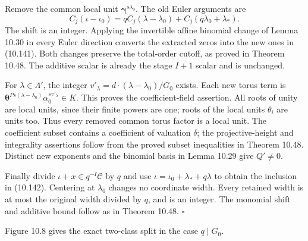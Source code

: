 \documentclass[
  11pt,
  a4paper,
]{article}
\begin{document}
Remove the common local unit \(\boldsymbol\gamma^{s\lambda_0}\). The old
Euler arguments are \[
C_j(\iota-\iota_0)=
qC_j(\lambda-\lambda_0)+C_j(q\lambda_0+\lambda_*).
\] The shift is an integer. Applying the invertible affine binomial
change of Lemma 10.30 in every Euler direction converts the extracted
zeros into the new ones in (10.141). Both changes preserve the
total-order cutoff, as proved in Theorem 10.48. The additive scalar is
already the stage \(I+1\) scalar and is unchanged.

For \(\lambda\in\Lambda'\), the integer
\(v'_\lambda=d\cdot(\lambda-\lambda_0)/G_0\) exists. Each new torus term
is
\(\boldsymbol\theta^{Ps(\lambda-\lambda_0)}\alpha_0^{s v'_\lambda}\in K\).
This proves the coefficient-field assertion. All roots of unity are
local units, since their finite powers are one; roots of the local units
\(\theta_i\) are units too. Thus every removed common torus factor is a
local unit. The coefficient subset contains a coefficient of valuation
\(\delta\); the projective-height and integrality assertions follow from
the proved subset inequalities in Theorem 10.48. Distinct new exponents
and the binomial basis in Lemma 10.29 give \(Q'\ne0\).

Finally divide \(\iota+x\in q^{-I}\mathcal C\) by \(q\) and use
\(\iota=\iota_0+\lambda_*+q\lambda\) to obtain the inclusion in
(10.142). Centering at \(\lambda_0\) changes no coordinate width. Every
retained width is at most the original width divided by \(q\), and is an
integer. The monomial shift and additive bound follow as in Theorem
10.48. \(\square\)

Figure 10.8 gives the exact two-class split in the case \(q\mid G_0\).
\end{document}
